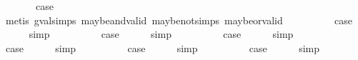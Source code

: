 \begin{isabellebody}
\isamarkupfalse%
\ {}\isanewline
\ \ \isamarkupfalse%
\ \isamarkupfalse%
\ {\isacharquery}case\isanewline
\ \ \ \ \isamarkupfalse%
\ {\isacharparenleft}metis\ gval{\isachardot}simps{\isacharparenleft}{}{\isacharparenright}\ maybe{\isacharunderscore}and{\isacharunderscore}valid\ maybe{\isacharunderscore}not{\isachardot}simps{\isacharparenleft}{}{\isacharparenright}\ maybe{\isacharunderscore}or{\isacharunderscore}valid{\isacharparenright}\isanewline
{}\isamarkupfalse%
\isanewline
\ \ \isamarkupfalse%
\ {\isachardoublequoteopen}{}{\isacharunderscore}{}{\isachardoublequoteclose}\isanewline
\ \ \isamarkupfalse%
\ \isamarkupfalse%
\ {\isacharquery}case\isanewline
\ \ \ \ \isamarkupfalse%
\ simp\isanewline
{}\isamarkupfalse%
\isanewline
\ \ \isamarkupfalse%
\ {\isachardoublequoteopen}{}{\isacharunderscore}{}{\isachardoublequoteclose}\isanewline
\ \ \isamarkupfalse%
\ \isamarkupfalse%
\ {\isacharquery}case\isanewline
\ \ \ \ \isamarkupfalse%
\ simp\isanewline
{}\isamarkupfalse%
\isanewline
\ \ \isamarkupfalse%
\ {}\isanewline
\ \ \isamarkupfalse%
\ \isamarkupfalse%
\ {\isacharquery}case\isanewline
\ \ \ \ \isamarkupfalse%
\ simp\isanewline
{}\isamarkupfalse%
\isanewline
\ \ \isamarkupfalse%
\ {\isachardoublequoteopen}{}{\isacharunderscore}{}{\isachardoublequoteclose}\isanewline
\ \ \isamarkupfalse%
\ \isamarkupfalse%
\ {\isacharquery}case\isanewline
\ \ \ \ \isamarkupfalse%
\ simp\isanewline
{}\isamarkupfalse%
\isanewline
\ \ \isamarkupfalse%
\ {\isachardoublequoteopen}{}{\isacharunderscore}{}{\isachardoublequoteclose}\isanewline
\ \ \isamarkupfalse%
\ \isamarkupfalse%
\ {\isacharquery}case\isanewline
\ \ \ \ \isamarkupfalse%
\ simp\isanewline
{}\isamarkupfalse%
\isanewline
\ \ \isamarkupfalse%
\ {}\isanewline
\ \ \isamarkupfalse%
\ \isamarkupfalse%
\ {\isacharquery}case\isanewline
\ \ \ \ \isamarkupfalse%
\ simp\isanewline
{}\isamarkupfalse%
%
\endisatagproof

\end{isabellebody}
